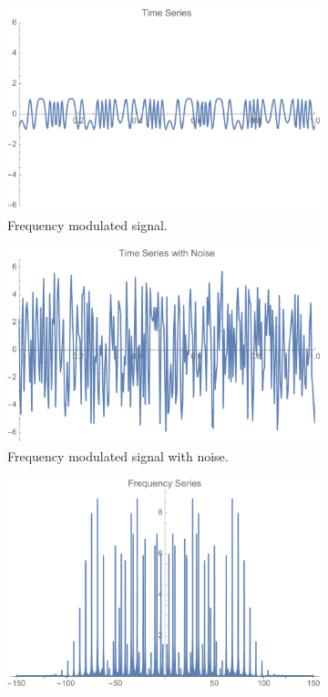 \documentclass[onecolumn, groupedaddress, 10pt]{revtex4-1}
\begin{document}
\begin{figure}[H]
	\centering
	\begin{subfigure}{.5\textwidth}
  		\centering
  		\includegraphics[width=.9\linewidth]{timeSeries.pdf}
  		\caption{\label{fig:results_1}Frequency modulated signal.}
	\end{subfigure}%
	\begin{subfigure}{.5\textwidth}
  		\centering
  		\includegraphics[width=.9\linewidth]{timeSeriesNoise.pdf}
  		\caption{\label{fig:results2}Frequency modulated signal with noise.}
	\end{subfigure}
	\begin{subfigure}{.5\textwidth}
  		\centering
  		\includegraphics[width=.9\linewidth]{fourierSeries.pdf}

\end{subfigure}
\end{figure}
\end{document}
